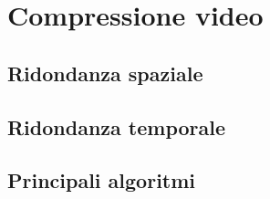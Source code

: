 \section{Compressione video}


\subsection{Ridondanza spaziale}


\subsection{Ridondanza temporale}


\subsection{Principali algoritmi}

